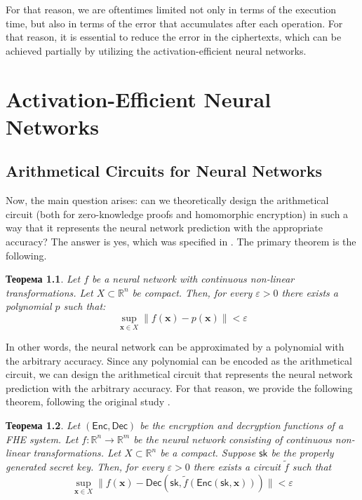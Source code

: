 \documentclass[12pt,a4paper,oneside]{book}
\theoremstyle{dplplain}
\newtheorem{theorem}{Теорема}[chapter]
\theoremstyle{dpldefinition}
\theoremstyle{dplremark}
\begin{document}
For that reason, we are oftentimes limited not only in terms of the execution
time, but also in terms of the error that accumulates after each operation. For
that reason, it is essential to reduce the error in the ciphertexts, which can
be achieved partially by utilizing the activation-efficient neural networks.

\chapter{Activation-Efficient Neural Networks}

\section{Arithmetical Circuits for Neural Networks}

Now, the main question arises: can we theoretically design the arithmetical 
circuit (both for zero-knowledge proofs and homomorphic encryption) in such a
way that it represents the neural network prediction with the appropriate 
accuracy? The answer is yes, which was specified in \cite{cryptonets}. 
The primary theorem is the following.

\begin{theorem}
    Let $f$ be a neural network with continuous non-linear transformations. Let
    $X \subset \mathbb{R}^n$ be compact. Then, for every $\varepsilon > 0$ there 
    exists a polynomial $p$ such that:
    \begin{equation*}
        \sup_{\mathbf{x} \in X}\|f(\mathbf{x}) - p(\mathbf{x})\| < \varepsilon
    \end{equation*}
\end{theorem}

In other words, the neural network can be approximated by a polynomial with the
arbitrary accuracy. Since any polynomial can be encoded as the arithmetical
circuit, we can design the arithmetical circuit that represents the neural
network prediction with the arbitrary accuracy. For that reason, we 
provide the following theorem, following the original study \cite{cryptonets}.

\begin{theorem}
    Let $(\mathsf{Enc}, \mathsf{Dec})$ be the encryption and decryption
    functions of a FHE system. Let $f: \mathbb{R}^n \to \mathbb{R}^m$ be the
    neural network consisting of continuous non-linear transformations. Let $X
    \subset \mathbb{R}^n$ be a compact. Suppose $\mathsf{sk}$ be the properly
    generated secret key. Then, for every $\varepsilon > 0$ there exists a
    circuit $\widetilde{f}$ such that
    \begin{equation*}
        \sup_{\mathbf{x} \in X}\|f(\mathbf{x}) - \mathsf{Dec}(\mathsf{sk}, \widetilde{f}(\mathsf{Enc}(\mathsf{sk},\mathbf{x})))\| < \varepsilon
    \end{equation*}
\end{theorem}
\end{document}
